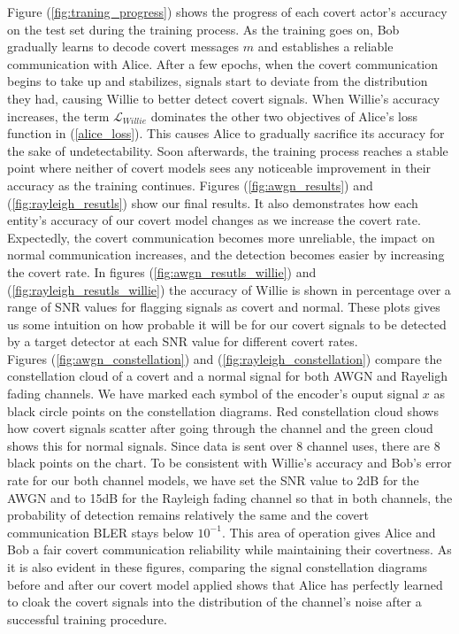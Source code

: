 Figure (\ref{fig:traning_progress}) shows the progress of each covert actor's accuracy on the test set during the training process. As the training goes on, Bob gradually learns to decode covert messages \(m\) and establishes a reliable communication with Alice. After a few epochs, when the covert communication begins to take up and stabilizes, signals start to deviate from the distribution they had, causing Willie to better detect covert signals. When Willie's accuracy increases, the term \(\mathcal{L}_{Willie}\) dominates the other two objectives of Alice's loss function in (\ref{alice_loss}). This causes Alice to gradually sacrifice its accuracy for the sake of undetectability. Soon afterwards, the training process reaches a stable point where neither of covert models sees any noticeable improvement in their accuracy as the training continues. Figures (\ref{fig:awgn_results}) and (\ref{fig:rayleigh_resutls}) show our final results. It also demonstrates how each entity's accuracy of our covert model changes as we increase the covert rate. Expectedly, the covert communication becomes more unreliable, the impact on normal communication increases, and the detection becomes easier by increasing the covert rate. In figures (\ref{fig:awgn_resutls_willie}) and (\ref{fig:rayleigh_resutls_willie}) the accuracy of Willie is shown in percentage over a range of SNR values for flagging signals as covert and normal. These plots gives us some intuition on how probable it will be for our covert signals to be detected by a target detector at each SNR value for different covert rates.\\
Figures (\ref{fig:awgn_constellation}) and (\ref{fig:rayleigh_constellation}) compare the constellation cloud of a covert and a normal signal for both AWGN and Rayeligh fading channels. We have marked each symbol of the encoder's ouput signal \(x\) as black circle points on the constellation diagrams. Red constellation cloud shows how covert signals scatter after going through the channel and the green cloud shows this for normal signals. Since data is sent over 8 channel uses, there are 8 black points on the chart. To be consistent with Willie's accuracy and Bob's error rate for our both channel models, we have set the SNR value to 2dB for the AWGN and to 15dB for the Rayleigh fading channel so that in both channels, the probability of detection remains relatively the same and the covert communication BLER stays below \(10^{-1}\). This area of operation gives Alice and Bob a fair covert communication reliability while maintaining their covertness. As it is also evident in these figures, comparing the signal constellation diagrams before and after our covert model applied shows that Alice has perfectly learned to cloak the covert signals into the distribution of the channel's noise after a successful training procedure.
